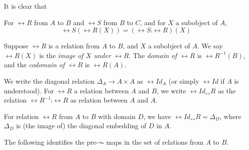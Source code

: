 It is clear that
\begin{prop}
For $\rel{R}$ from $A$ to $B$ and $\rel{S}$ from $B$ to $C$, and 
for $X$ a subobject of $A$,
\[
\rel{S}(\rel{R}(X)) = (\rel{S} \comp \rel{R})(X)
\]
\end{prop}

\begin{definition}
Suppose $\rel{R}$ is a relation from $A$ to $B$, and $X$ a subobject
of $A$. We say $\rel{R}(X)$ is the \emph{image of $X$ under $\rel{R}$}.
The \emph{domain of $\rel{R}$} is $\rel{R}^{-1}(B)$, and the 
\emph{codomain of $\rel{R}$} is $\rel{R}(A)$.
\end{definition}

\begin{definition}
We write the diagonal relation $\Delta_A \to A \times A$ as 
$\rel{Id}_A$ (or simply $\rel{Id}$ if $A$ is understood). 
For $\rel{R}$ a relation between $A$ and $B$, we write 
$\rel{Id}_\rel{R}$ as the relation $\rel{R}^{-1} \comp \rel{R}$ 
as relation between $A$ and $A$.
\end{definition}

\begin{prop}
For relation $\rel{R}$ from $A$ to $B$ with domain $D$, we have 
$\rel{Id}_\rel{R} = \Delta_D$, where $\Delta_D$ is (the image of) 
the diagonal embedding of $D$ in $A$.
\end{prop}

The following identifies the pre-$\AC$ maps in the set of relations
from $A$ to $B$.

